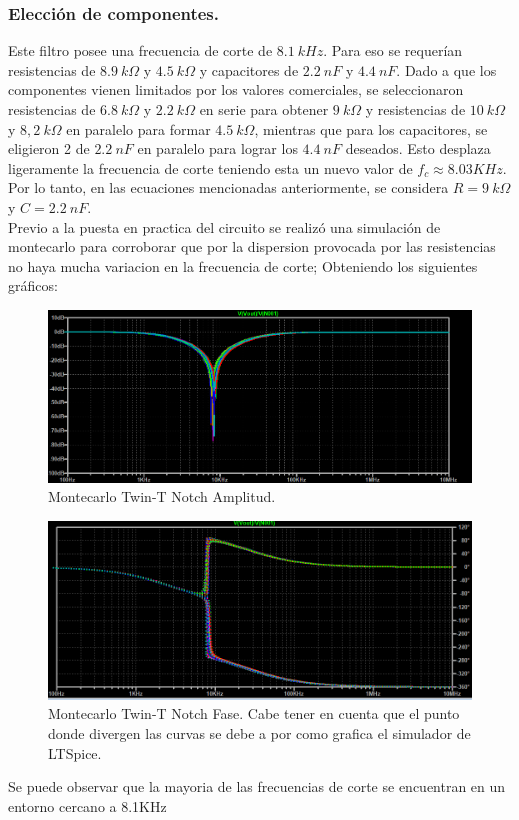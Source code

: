 \documentclass[a4paper]{article}
\begin{document}
\subsubsection{Elección de componentes.}
 Este filtro posee una frecuencia de corte de $ 8.1 \ kHz $. Para eso se requerían resistencias de $ 8.9 \ k\Omega $ y $ 4.5 \ k\Omega $ y capacitores de $ 2.2 \ nF $ y $ 4.4 \ nF $.
Dado a que los componentes vienen limitados por los valores comerciales,  se seleccionaron resistencias de $ 6.8 \ k\Omega $ y $ 2.2 \ k\Omega $ en serie para obtener  $ 9 \ k\Omega $ y  resistencias de $ 10 \ k\Omega $ y $ 8,2 \ k\Omega $ en paralelo para formar $ 4.5 \ k\Omega $, mientras que para los capacitores, se eligieron 2 de $ 2.2 \ nF $ en paralelo para lograr los $ 4.4 \ nF $ deseados. Esto desplaza ligeramente la frecuencia de corte teniendo esta un nuevo valor de $f_c \approx 8.03 KHz$. Por lo tanto, en las ecuaciones mencionadas anteriormente, se considera $ R = 9 \ k\Omega $ y $ C = 2.2 \ nF $.\\
Previo a la puesta en practica del circuito se realizó una simulación de montecarlo para corroborar que por la dispersion provocada por las resistencias no haya mucha variacion en la frecuencia de corte; Obteniendo los siguientes gráficos:
\begin{figure}[H]
	\centering
	\includegraphics[width=\textwidth ]{Montecarlo.PNG}
\caption{Montecarlo Twin-T Notch Amplitud.}
	\label{fig:Montecarlo}
\end{figure}
\begin{figure}[H]
	\centering
	\includegraphics[width=\textwidth]{MontecarloPh.PNG}
\caption{Montecarlo Twin-T Notch Fase. Cabe tener en cuenta que el punto donde divergen las curvas se debe a por como grafica el simulador de LTSpice.}
	\label{fig:MontecarloFase}
\end{figure}
Se puede observar que la mayoria de las frecuencias de corte se encuentran en un entorno cercano a 8.1KHz
\end{document}
